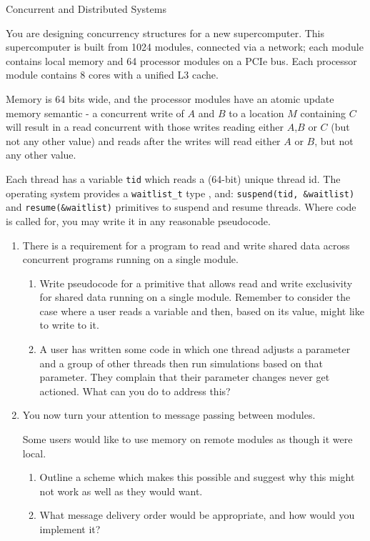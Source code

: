 \documentclass{tripos}  %
\begin{document}
\begin{question}[MockIB,year=2024,paper=2,question=1,author=rrw]{Concurrent and Distributed Systems}


You are designing concurrency structures for a new supercomputer. This supercomputer is built from 1024 modules, connected via a network; each module contains local memory and 64 processor modules on a PCIe bus. Each processor module contains 8 cores with a unified L3 cache.

Memory is 64 bits wide, and the processor modules have an atomic update memory semantic - a concurrent write of $A$ and $B$ to a location $M$ containing $C$ will result in a read concurrent with those writes reading either $A$,$B$ or $C$ (but not any other value) and reads after the writes will read either $A$ or $B$, but not any other value.

Each thread has a variable \texttt{tid} which reads a (64-bit) unique thread id. The operating system provides a \texttt{waitlist\_t} type , and:
\texttt{suspend(tid, \&waitlist)} and \texttt{resume(\&waitlist)} primitives to suspend and resume threads. Where code is called for, you may write it in any reasonable pseudocode.

\begin{enumerate}
\item There is a requirement for a program to read and write shared data across concurrent programs running on a single module.
  \begin{enumerate}
  \item Write pseudocode for a primitive that allows read and write exclusivity for shared data running on a single module. Remember to consider the case where a user reads a variable and then, based on its value, might like to write to it.
  \item A user has written some code in which one thread adjusts a parameter and a group of other threads then run simulations based on that parameter. They complain that their parameter changes never get actioned. What can you do to address this? 
  \end{enumerate}
\item You now turn your attention to message passing between modules.

  Some users would like to use memory on remote modules as though it were local.
    \begin{enumerate}
    \item Outline a scheme which makes this possible and suggest why this might not work as well as they would want. 
    \item What message delivery order would be appropriate, and how would you implement it? 
    \end{enumerate}


\end{enumerate}
\end{question}
\end{document}
